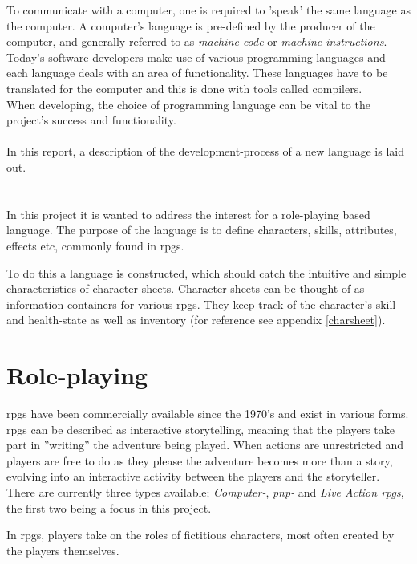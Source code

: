 
To communicate with a computer, one is required to 'speak' the same language as the computer. A computer's language is pre-defined by the producer of the computer, and generally referred to as \emph{machine code} or \emph{machine instructions}.\\
Today's software developers make use of various programming languages and each language deals with an area of functionality. These languages have to be translated for the computer and this is done with tools called compilers.\\
When developing, the choice of programming language can be vital to the project's success and functionality.\\\\
In this report, a description of the development-process of a new language is laid out.

\section{\langname{}}
In this project it is wanted to address the interest for a role-playing based language. The purpose of the language is to define characters, skills, attributes, effects etc, commonly found in \ac{rpgs}.

To do this a language is constructed, which should catch the intuitive and simple characteristics of character sheets. Character sheets can be thought of as information containers for various \ac{rpgs}. They keep track of the character's skill- and health-state as well as inventory (for reference see appendix \vref{charsheet}).

\section{Role-playing}
\ac{rpgs} have been commercially available since the 1970's and exist in various forms. \ac{rpgs} can be described as interactive storytelling, meaning that the players take part in ''writing'' the adventure being played. When actions are unrestricted and players are free to do as they please the adventure becomes more than a story, evolving into an interactive activity between the players and the storyteller.
There are currently three types available; \emph{Computer-}, \emph{\ac{pnp}-} and \emph{Live Action \ac{rpgs}}, the first two being a focus in this project.

In \ac{rpgs}, players take on the roles of fictitious characters, most often created by the players themselves.


